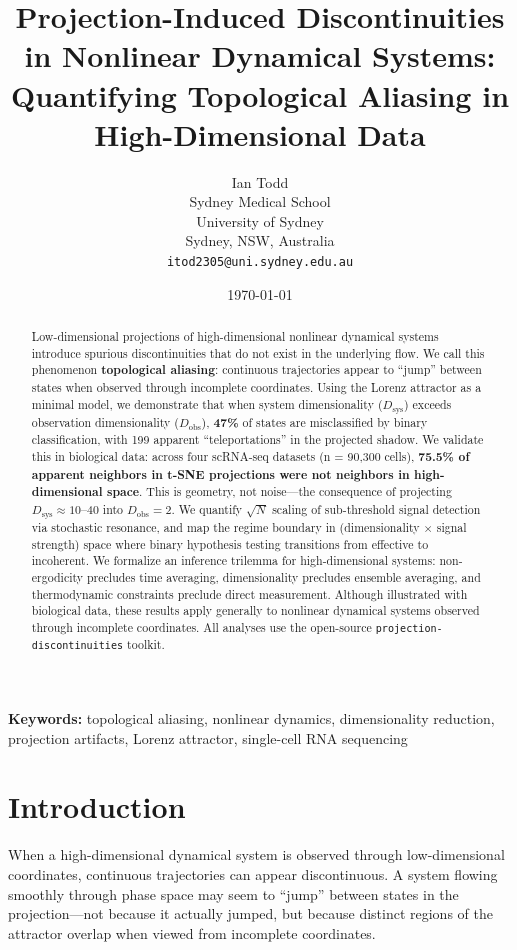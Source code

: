 \documentclass[12pt]{article}
\title{Projection-Induced Discontinuities in Nonlinear Dynamical Systems: Quantifying Topological Aliasing in High-Dimensional Data}
\author{Ian Todd\\
Sydney Medical School\\
University of Sydney\\
Sydney, NSW, Australia\\
\texttt{itod2305@uni.sydney.edu.au}}
\date{\today}
\begin{document}
\maketitle

\begin{abstract}
Low-dimensional projections of high-dimensional nonlinear dynamical systems introduce spurious discontinuities that do not exist in the underlying flow. We call this phenomenon \textbf{topological aliasing}: continuous trajectories appear to ``jump'' between states when observed through incomplete coordinates. Using the Lorenz attractor as a minimal model, we demonstrate that when system dimensionality ($D_{\text{sys}}$) exceeds observation dimensionality ($D_{\text{obs}}$), \textbf{47\%} of states are misclassified by binary classification, with 199 apparent ``teleportations'' in the projected shadow. We validate this in biological data: across four scRNA-seq datasets (n = 90,300 cells), \textbf{75.5\% of apparent neighbors in t-SNE projections were not neighbors in high-dimensional space}. This is geometry, not noise---the consequence of projecting $D_{\text{sys}} \approx 10$--40 into $D_{\text{obs}} = 2$. We quantify $\sqrt{N}$ scaling of sub-threshold signal detection via stochastic resonance, and map the regime boundary in (dimensionality $\times$ signal strength) space where binary hypothesis testing transitions from effective to incoherent. We formalize an inference trilemma for high-dimensional systems: non-ergodicity precludes time averaging, dimensionality precludes ensemble averaging, and thermodynamic constraints preclude direct measurement. Although illustrated with biological data, these results apply generally to nonlinear dynamical systems observed through incomplete coordinates. All analyses use the open-source \texttt{projection-discontinuities} toolkit.
\end{abstract}

\textbf{Keywords:} topological aliasing, nonlinear dynamics, dimensionality reduction, projection artifacts, Lorenz attractor, single-cell RNA sequencing

\section{Introduction}

When a high-dimensional dynamical system is observed through low-dimensional coordinates, continuous trajectories can appear discontinuous. A system flowing smoothly through phase space may seem to ``jump'' between states in the projection---not because it actually jumped, but because distinct regions of the attractor overlap when viewed from incomplete coordinates.
\end{document}
